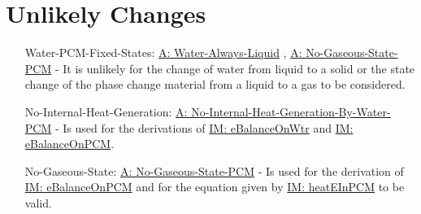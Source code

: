 \documentclass[12pt]{article}
\begin{document}
\section{Unlikely Changes}
\label{Sec:UCs}
\begin{itemize}
\item[Water-PCM-Fixed-States:\phantomsection\label{unlikeChgWPFS}]\hyperref[A:Water-Always-Liquid]{A: Water-Always-Liquid} ,  \hyperref[A:No-Gaseous-State-PCM]{A: No-Gaseous-State-PCM} - It is unlikely for the change of water from liquid to a solid or the state change of the phase change material from a liquid to a gas to be considered.
\item[No-Internal-Heat-Generation:\phantomsection\label{unlikeChgNIHG}]\hyperref[A:No-Internal-Heat-Generation-By-Water-PCM]{A: No-Internal-Heat-Generation-By-Water-PCM} - Is used for the derivations of \hyperref[IM:eBalanceOnWtr]{IM: eBalanceOnWtr} and \hyperref[IM:eBalanceOnPCM]{IM: eBalanceOnPCM}.
\item[No-Gaseous-State:\phantomsection\label{unlikeChgNGS}]\hyperref[A:No-Gaseous-State-PCM]{A: No-Gaseous-State-PCM} - Is used for the derivation of \hyperref[IM:eBalanceOnPCM]{IM: eBalanceOnPCM} and for the equation given by \hyperref[IM:heatEInPCM]{IM: heatEInPCM} to be valid.
\end{itemize}
\end{document}
